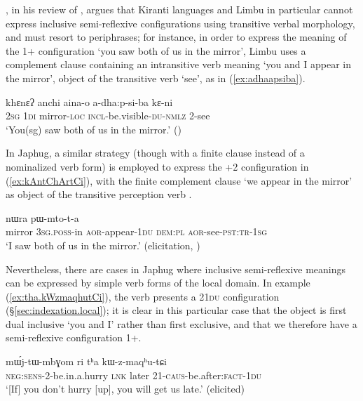 \citet{driem90hayu}, in his review of \citet{michailovsky88}, argues that Kiranti languages and Limbu in particular cannot express inclusive semi-reflexive configurations using transitive verbal morphology, and must resort to periphrases; for instance, in order to express the meaning of the \fl{}1+ configuration `you saw both of us in the mirror', Limbu uses a complement clause containing an intransitive verb meaning `you and I appear in the mirror', object of the transitive verb `see', as in (\ref{ex:adhaapsiba}).

\begin{exe}
\ex   \label{ex:adhaapsiba}
\gll  khɛnɛʔ  anchi aina-o a-dha:p-si-ba kɛ-ni \\
\textsc{2sg} \textsc{1di} mirror-\textsc{loc} \textsc{incl}-be.visible-\textsc{du}-\textsc{nmlz} 2-see \\
\glt `You(sg) saw both of us in the mirror.’ (\citealt[277]{driem90hayu})
\end{exe}

In Japhug, a similar strategy (though with a finite clause instead of a nominalized verb form) is employed to express the \fl{}+2 configuration in (\ref{ex:kAntChArtCi}), with the finite complement clause  `we appear in the mirror' as object of the transitive perception verb .

\begin{exe}
\ex   \label{ex:kAntChArtCi}
 nɯra pɯ-mto-t-a \\
mirror \textsc{3sg}.\textsc{poss}-in \textsc{aor}-appear-\textsc{1du} \textsc{dem}:\textsc{pl} \textsc{aor}-see-\textsc{pst}:\textsc{tr}-\textsc{1sg} \\
\glt `I saw both of us in the mirror.' (elicitation, \citealt[85]{jacques12agreement})
\end{exe}

Nevertheless, there are cases in Japhug where inclusive semi-reflexive meanings can be expressed by simple verb forms of the local domain. In example (\ref{ex:tha.kWzmaqhutCi}), the verb  presents a 2\fl{}\textsc{1du} configuration (§\ref{sec:indexation.local}); it is clear in this particular case that the object is first dual inclusive `you and I' rather than first exclusive, and that we therefore have a semi-reflexive configuration \fl{}1+.

\begin{exe}
\ex   \label{ex:tha.kWzmaqhutCi}
\gll   mɯ́j-tɯ-mbɣom ri tʰa kɯ-z-maqʰu-tɕi \\
\textsc{neg}:\textsc{sens}-2-be.in.a.hurry \textsc{lnk} later 2\fl{}1-\textsc{caus}-be.after:\textsc{fact}-\textsc{1du} \\
\glt `[If] you don't hurry [up], you will get us late.' (elicited)
\end{exe}

